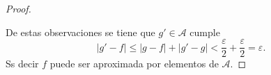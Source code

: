 \begin{proof}
\begin{itemize}
    \end{itemize}
    De estas observaciones se tiene que  $g' \in \mathcal{A}$ cumple 
    \begin{equation}
        |g'-f| \leq |g-f| + |g'-g| 
        <
         \frac{\varepsilon}{2} + \frac{\varepsilon}{2} 
        = 
        \varepsilon.
    \end{equation}
    Ss decir $f$ puede ser aproximada por elementos de $\mathcal{A}$.
\end{proof}
